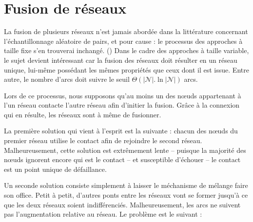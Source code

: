 
\section{Fusion de réseaux}
\label{net:sec:merging}

La fusion de plusieurs réseaux n'est jamais abordée dans la littérature
concernant l'échantillonnage aléatoire de pairs, et pour cause : le processus
des approches à taille fixe s'en trouverai inchangé. () Dans le cadre des
approches à taille variable, le sujet devient intéressant car la fusion des
réseaux doit résulter en un réseau unique, lui-même possédant les mêmes
propriétés que ceux dont il est issue. Entre autre, le nombre d'arcs doit suivre
le seuil $\Theta (|\mathcal{N}|.\ln |\mathcal{N}|)$ arcs.

Lors de ce processus, nous supposons qu'au moins un des nœuds appartenant à l'un
réseau contacte l'autre réseau afin d'initier la fusion. Grâce à la connexion
qui en résulte, les réseaux sont à même de fusionner.

La première solution qui vient à l'esprit est la suivante : chacun des nœuds du
premier réseau utilise le contact afin de rejoindre le second
réseau. Malheureusement, cette solution est extrêmement lente -- puisque la
majorité des nœuds ignorent encore qui est le contact -- et susceptible
d'échouer -- le contact est un point unique de défaillance.

Un seconde solution consiste simplement à laisser le méchanisme de mélange faire
son office. Petit à petit, d'autres ponts entre les réseaux vont se former
jusqu'à ce que les deux réseaux soient indifférenciés. Malheureusement, les arcs
ne suivent pas l'augmentation relative au réseau. Le problème est le suivant :


